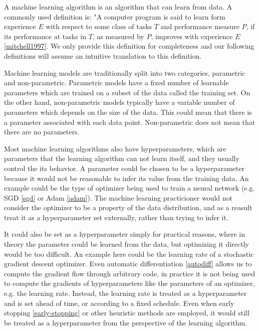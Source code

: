 A machine learning algorithm is an algorithm that can learn from data. A
commonly used definition is: "A computer program is said to learn form
experience $E$ with respect to some class of tasks $T$ and performance measure
$P$, if its performance at tasks in $T$, as measured by $P$, improves with
experience $E$ \ref{mitchell1997}. We only provide this definition for
completeness and our following definitions will assume an intuitive translation
to this definition.

Machine learning models are traditionally split into two categories, parametric
and non-parametric. Parametric models have a fixed number of learnable parameters
which are trained on a subset of the data called the training set. On the other hand,
non-parametric models typically have a variable number of parameters which depends on
the size of the data. This could mean that there is a parameter associated with each
data point. Non-parametric does not mean that there are no parameters.

Most machine learning algorithms also have hyperparameters, which are
parameters that the learning algorithm can not learn itself, and they usually
control the its behavior. A parameter could be chosen to be a hyperparameter
because it would not be reasonable to infer its value from the training data.
An example could be the type of optimizer being used to train a neural network
(e.g. SGD \ref{sgd} or Adam \ref{adam}). The machine learning practicioner
would not consider the optimizer to be a property of the data distribution, and
as a reasult treat it as a hyperparameter set externally, rather than trying to
infer it.

It could also be set as a hyperparameter simply for practical reasons, where in
theory the parameter could be learned from the data, but optimizing it directly
would be too difficult. An example here could be the learning rate of a
stochastic gradient descent optimizer. Even automatic differentiation
\ref{autodiff} allows us to compute the gradient flow through arbitrary code,
in practice it is not being used to compute the gradients of hyperparameters
like the parameters of an optimizer, e.g. the learning rate. Instead, the
learning rate is treated as a hyperparameter and is set ahead of time, or
according to a fixed schedule. Even when early stopping \ref{early-stopping} or
other heuristic methods are employed, it would still be treated as a
hyperparameter from the perspective of the learning algorithm.

